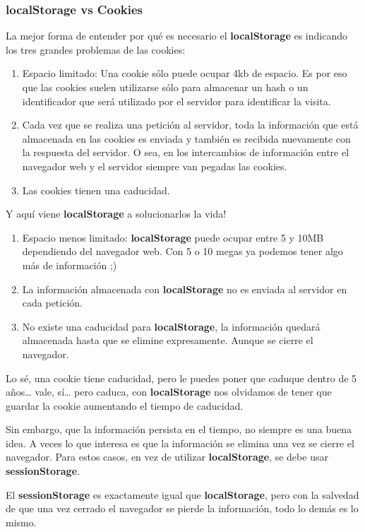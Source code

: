 \documentclass{apuntes}
\begin{document}
\subsubsection{localStorage vs Cookies}
La mejor forma de entender por qué es necesario el \textbf{localStorage} es indicando los tres grandes problemas de las cookies:
\begin{enumerate}
\item Espacio limitado: Una cookie sólo puede ocupar 4kb de espacio. Es por eso que las cookies suelen utilizarse sólo para almacenar un hash o un identificador que será utilizado por el servidor para identificar la visita.
\item Cada vez que se realiza una petición al servidor, toda la información que está almacenada en las cookies es enviada y también es recibida nuevamente con la respuesta del servidor. O sea, en los intercambios de información entre el navegador web y el servidor siempre van pegadas las cookies.
\item Las cookies tienen una caducidad.
\end{enumerate}

Y aquí viene \textbf{localStorage} a solucionarlos la vida!

\begin{enumerate}
\item Espacio menos limitado: \textbf{localStorage} puede ocupar entre 5 y 10MB dependiendo del navegador web. Con 5 o 10 megas ya podemos tener algo más de información ;)
\item La información almacenada con \textbf{localStorage} no es enviada al servidor en cada petición.
\item No existe una caducidad para \textbf{localStorage}, la información quedará almacenada hasta que se elimine expresamente. Aunque se cierre el navegador.
\end{enumerate}

Lo sé, una cookie tiene caducidad, pero le puedes poner que caduque dentro de 5 años… vale, sí… pero caduca, con \textbf{localStorage} nos olvidamos de tener que guardar la cookie aumentando el tiempo de caducidad.

Sin embargo, que la información persista en el tiempo, no siempre es una buena idea. A veces lo que interesa es que la información se elimina una vez se cierre el navegador. Para estos casos, en vez de utilizar \textbf{localStorage}, se debe usar \textbf{sessionStorage}.

El \textbf{sessionStorage} es exactamente igual que \textbf{localStorage}, pero con la salvedad de que una vez cerrado el navegador se pierde la información, todo lo demás es lo mismo.
\end{document}
